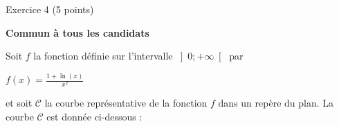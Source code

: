 
%
\begin{h2}Exercice 4   (5 points)\end{h2}
\textbf{Commun à tous les candidats}
\par
Soit $f$ la fonction définie sur l'intervalle $\left]0 ;+\infty \right[$ par

\begin{center}
$f\left(x\right)=\frac{1+\ln \left(x\right)}{x^{2}}$
\end{center}
et soit $\mathscr C$ la courbe représentative de la fonction $f$ dans un repère du plan. La courbe $\mathscr C$ est donnée ci-dessous :

\begin{center}
\end{center}

